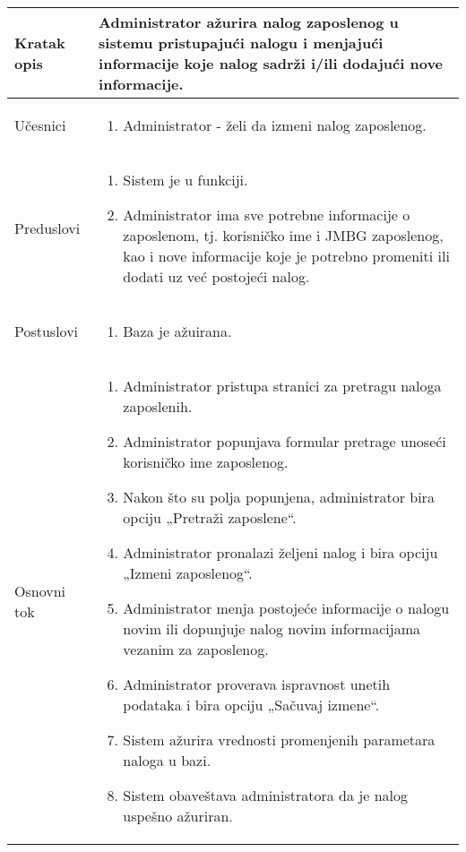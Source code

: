 \documentclass[../main.tex]{subfiles}
\begin{document}
\begin{longtable}{| p{} | p{} |} 

\hline
    Kratak opis &  Administrator ažurira nalog zaposlenog u sistemu pristupajući nalogu i menjajući informacije koje nalog sadrži i/ili dodajući nove informacije.\\ 
\hline    
    Učesnici & 
    	\begin{enumerate}
        \item Administrator - želi da izmeni nalog zaposlenog.
     \end{enumerate}\\
\hline
   Preduslovi & \begin{enumerate}
       \item Sistem je u funkciji.
       \item Administrator ima sve potrebne informacije o zaposlenom, tj. korisničko ime i JMBG zaposlenog, kao i nove informacije koje je potrebno promeniti ili dodati uz već postojeći nalog.
   \end{enumerate}\\
\hline  
    Postuslovi & \begin{enumerate}
        \item Baza je ažuirana.
    \end{enumerate}\\
\hline
    Osnovni tok & \begin{enumerate}
        \item Administrator pristupa stranici za pretragu naloga zaposlenih.
        \item Administrator popunjava formular pretrage unoseći korisničko ime zaposlenog.
        \item Nakon što su polja popunjena, administrator bira opciju „Pretraži zaposlene“.
        \item Administrator pronalazi željeni nalog i bira opciju „Izmeni zaposlenog“.
        \item Administrator menja postojeće informacije o nalogu novim ili dopunjuje nalog novim informacijama vezanim za zaposlenog.
        \item Administrator proverava ispravnost unetih podataka i bira opciju „Sačuvaj izmene“.
        \item Sistem ažurira vrednosti promenjenih parametara naloga u bazi.
        \item Sistem obaveštava administratora da je nalog uspešno ažuriran.

\end{enumerate}
\end{longtable}
\end{document}
